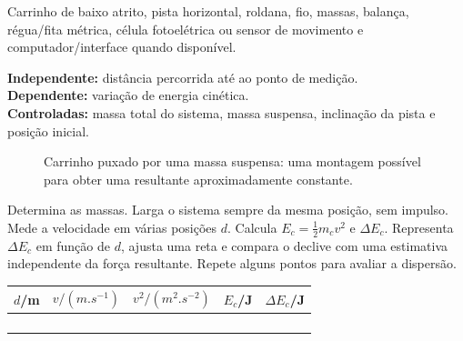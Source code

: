 \documentclass[11pt,a4paper,openany]{book}
\begin{document}
\begin{material}
Carrinho de baixo atrito, pista horizontal, roldana, fio, massas, balança, régua/fita métrica, célula fotoelétrica ou sensor de movimento e computador/interface quando disponível.
\end{material}

\begin{variaveis}
\textbf{Independente:} distância percorrida até ao ponto de medição.\\
\textbf{Dependente:} variação de energia cinética.\\
\textbf{Controladas:} massa total do sistema, massa suspensa, inclinação da pista e posição inicial.
\end{variaveis}

\begin{figure}[H]
\centering
{}
\caption{Carrinho puxado por uma massa suspensa: uma montagem possível para obter uma resultante aproximadamente constante.}
\end{figure}

\begin{metodo}
Determina as massas. Larga o sistema sempre da mesma posição, sem impulso. Mede a velocidade em várias posições $d$. Calcula $E_c=\tfrac12m_cv^2$ e $\Delta E_c$. Representa $\Delta E_c$ em função de $d$, ajusta uma reta e compara o declive com uma estimativa independente da força resultante. Repete alguns pontos para avaliar a dispersão.
\end{metodo}

\begin{registo}
\begin{center}
\begin{tabular}{@{}ccccc@{}}
\toprule
$d$/m & $v/(\si{m.s^{-1}})$ & $v^2/(\si{m^2.s^{-2}})$ & $E_c$/J & $\Delta E_c$/J\\
\midrule
& & & &\\ & & & &\\ & & & &\\ & & & &\\
\bottomrule
\end{tabular}
\end{center}
\end{registo}
\end{document}
